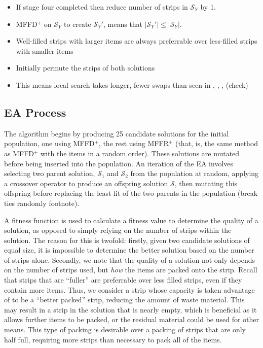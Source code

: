 \documentclass{elsarticle}
\begin{document}
\begin{itemize}
	\item If stage four completed then reduce number of strips in $\mathcal{S}_Y$ by 1.
	\item MFFD$^+$ on $\mathcal{S}_Y$ to create $\mathcal{S}_Y'$, means that $|\mathcal{S}_Y'| \leq |\mathcal{S}_Y|$.
	\item Well-filled strips with larger items are always preferrable over less-filled strips with smaller items \cite{levine2004}
	\item Initially permute the strips of both solutions
	\item This means local search takes longer, fewer swaps than seen in \cite{lewis2009}, \cite{lewis2017}, \cite{levine2004}, \cite{falkenauer1996} (check)
\end{itemize}

\subsection{EA Process}
\label{sub:eaframework}
The algorithm begins by producing 25 candidate solutions for the initial population, one using MFFD$^+$, the rest using MFFR$^+$ (that, is, the same method as MFFD$^+$ with the items in a random order). These solutions are mutated before being inserted into the population. An iteration of the EA involves selecting two parent solution, $\mathcal{S}_1$ and $\mathcal{S}_2$ from the population at random, applying a crossover operator to produce an offspring solution $\mathcal{S}$, then mutating this offspring before replacing the least fit of the two parents in the population (break ties randomly footnote). 

A fitness function is used to calculate a fitness value to determine the quality of a solution, as opposed to simply relying on the number of strips within the solution. The reason for this is twofold: firstly, given two candidate solutions of equal size, it is impossible to determine the better solution based on the number of strips alone. Secondly, we note that the quality of a solution not only depends on the number of strips used, but \emph{how} the items are packed onto the strip. Recall that strips that are ``fuller'' are preferrable over less filled strips, even if they contain more items. Thus, we consider a strip whose capacity is taken advantage of to be a ``better packed'' strip, reducing the amount of waste material. This may result in a strip in the solution that is nearly empty, which is beneficial as it allows further items to be packed, or the residual material could be used for other means. This type of packing is desirable over a packing of strips that are only half full, requiring more strips than necessary to pack all of the items. 
\end{document}
